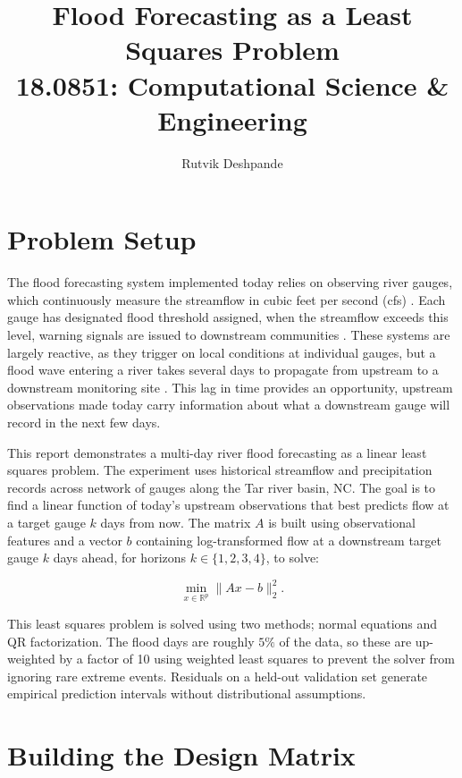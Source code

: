 \documentclass[10pt, twocolumn]{article}
\title{
  \vspace{-0.5em}
  {\large\bfseries Flood Forecasting as a Least Squares Problem}\\[4pt]
  {\normalsize 18.0851: Computational Science \& Engineering}
  \vspace{-0.5em}
}
\author{Rutvik Deshpande}
\date{}
\begin{document}
\twocolumn[
  \maketitle

]

\section{Problem Setup}

The flood forecasting system implemented today relies on observing river gauges, which continuously measure the streamflow in cubic feet per second (cfs) \cite{usgs_nwis}. Each gauge has designated flood threshold assigned, when the streamflow exceeds this level, warning signals are issued to downstream communities \cite{wmo2011}. These systems are largely reactive, as they trigger on local conditions at individual gauges, but a flood wave entering a river takes several days to propagate from upstream to a downstream monitoring site \cite{lighthill1955, chow1988}. This lag in time provides an opportunity, upstream observations made today carry information about what a downstream gauge will record in the next few days. 

This report demonstrates a multi-day river flood forecasting as a linear least squares problem. The experiment uses historical streamflow and precipitation records across network of gauges along the Tar river basin, NC. The goal is to find a linear function of today's upstream observations that best predicts flow at a target gauge $k$ days from now. The matrix $A$ is built using observational features and a vector $b$ containing log-transformed flow at a downstream target gauge $k$ days ahead, for horizons $k \in \{1,2,3,4\}$, to solve: 

\[
  \min_{x \in \mathbb{R}^p} \|Ax - b\|_2^2.
\]

This least squares problem is solved using two methods; normal equations and QR factorization. The flood days are roughly $5\%$ of the data, so these are up-weighted by a factor of 10 using weighted least squares to prevent the solver from ignoring rare extreme events. Residuals on a held-out validation set generate empirical prediction intervals without distributional assumptions.

\section{Building the Design Matrix}
\end{document}
